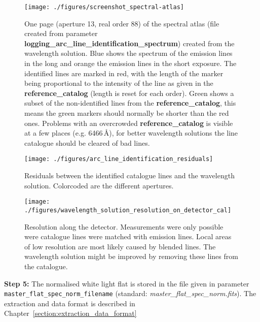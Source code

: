 \documentclass[10pt,a4paper]{article}
\begin{document}
\begin{figure} 
  \begin{center}
    \texttt{[image: ./figures/screenshot\_spectral-atlas]}
  \end{center} 
  \caption{One page (aperture 13, real order 88) of the spectral atlas (file created from parameter \textbf{logging\_arc\_line\_identification\_spectrum}) created from the wavelength solution. Blue shows the spectrum of the emission lines in the long and orange the emission lines in the short exposure. The identified lines are marked in red, with the length of the marker being proportional to the intensity of the line as given in the \textbf{reference\_catalog} (length is reset for each order). Green shows a subset of the non-identified lines from the \textbf{reference\_catalog}, this means the green markers should normally be shorter than the red ones. Problems with an overcrowded \textbf{reference\_catalog} is visible at a few places (e.g. 6466\,\AA), for better wavelength solutions the line catalogue should be cleared of bad lines.
    \label{figure_arc_line_identification_spectrum}}
\end{figure}


\begin{figure} 
  \begin{center}
    \texttt{[image: ./figures/arc\_line\_identification\_residuals]}
  \end{center} 
  \caption{Residuals between the identified catalogue lines and the wavelength solution. Colorcoded are the different apertures.
    \label{figure_arc_line_identification_residuals}}
\end{figure}

\begin{figure} 
  \begin{center}
    \texttt{[image: ./figures/wavelength\_solution\_resolution\_on\_detector\_cal]}
  \end{center} 
  \caption{Resolution along the detector. Measurements were only possible were catalogue lines were matched with emission lines. Local areas of low resolution are most likely caused by blended lines. The wavelength solution might be improved by removing these lines from the catalogue.
    \label{figure_wavelength_solution_resolution}}
\end{figure}



\vspace{0.5em}\noindent \textbf{Step 5:} The normalised white light flat is stored in the file given in parameter \verb|master_flat_spec_norm_filename| (standard: \textit{master\_flat\_spec\_norm.fits}). The extraction and data format is described in Chapter~\ref{section:extraction_data_format}
\end{document}
